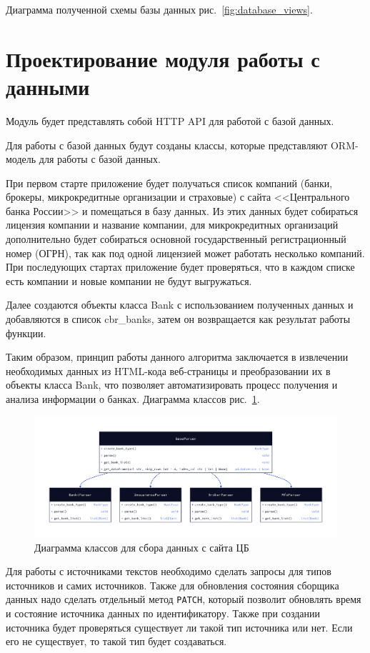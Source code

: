 \documentclass{article}
\begin{document}
Диаграмма полученной схемы базы данных рис.~\ref{fig:database_views}.
\section{Проектирование модуля работы с данными}
\label{sec:org422fb35}
Модуль будет представлять собой HTTP API для работой с базой данных.

Для работы с базой данных будут созданы классы, которые представляют ORM-модель для работы с базой данных.

При первом старте приложение будет получаться список компаний (банки, брокеры, микрокредитные организации и страховые) с сайта {}<<Центрального банка России>>{} и помещаться в базу данных. Из этих данных будет собираться лицензия компании и название компании, для микрокредитных организаций дополнительно будет собираться основной государственный регистрационный номер (ОГРН), так как под одной лицензией может работать несколько компаний. При последующих стартах приложение будет проверяться, что в каждом списке есть компании и новые компании не будут выгружаться.

Далее создаются объекты класса Bank с использованием полученных данных и добавляются в список  cbr\_banks, затем он возвращается как результат работы функции.

Таким образом, принцип работы данного алгоритма заключается в извлечении необходимых данных из HTML-кода веб-страницы и преобразовании их в объекты класса Bank, что позволяет автоматизировать процесс получения и анализа информации о банках. Диаграмма классов рис.~\ref{fig:cbr_parser_class}.

\begin{figure}[h!]
\centering
\includegraphics[width=\textwidth]{img/d2/cbr_parser_class.png}
\caption{\label{fig:cbr_parser_class}Диаграмма классов для сбора данных с сайта ЦБ}
\end{figure}

Для работы с источниками текстов необходимо сделать запросы для типов источников и самих источников. Также для обновления состояния сборщика данных надо сделать отдельный метод \texttt{PATCH}, который позволит обновлять время и состояние источника данных по идентификатору. Также при создании источника будет проверяться существует ли такой тип источника или нет. Если его не существует, то такой тип будет создаваться.
\end{document}
